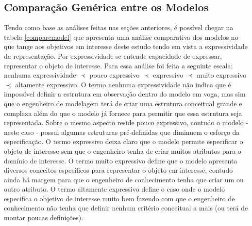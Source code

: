 \subsection{Comparação Genérica entre os Modelos}

Tendo como base as análises feitas nas seções anteriores, é possível chegar na tabela \ref{comparemodel} que apresenta uma análise comparativa dos modelos no que tange aos objetivos em 
interesse deste estudo tendo em vista a expressividade da representação. Por expressividade se entende capacidade de expressar, representar o objeto de interesse. Para essa análise 
foi feita a seguinte escala; nenhuma expressividade $\prec$ pouco expressivo $\prec$ expressivo $\prec$ muito expressivo $\prec$ altamente expressivo. O termo nenhuma expressividade 
não indica que é impossível definir a estrutura em observação dentro do modelo em voga, mas sim que o engenheiro de modelagem terá de criar uma estrutura conceitual grande e complexa 
além do que o modelo já fornece para permitir que essa estrutura seja representada. Sobre o mesmo aspecto reside pouco expressivo, contudo o modelo - neste caso - possui algumas 
estruturas pré-definidas que diminuem o esforço da especificação. O termo expressivo deixa claro que o modelo permite especificar o objeto de interesse sem que o engenheiro 
tenha de criar muitos atributos para o domínio de interesse. O termo muito expressivo define que o modelo apresenta diversos conceitos específicos para representar o objeto em interesse, 
contudo ainda há margem para que o engenheiro de conhecimento tenha que criar um ou outro atributo. O termo altamente expressivo define o caso onde o modelo especifica o objetivo 
de interesse muito bem fazendo com que o engenheiro de conhecimento não tenha que definir nenhum critério conceitual a mais (ou terá de montar poucas definições).   

